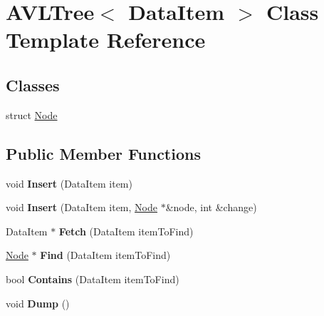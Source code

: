 \hypertarget{classAVLTree}{\section{A\-V\-L\-Tree$<$ Data\-Item $>$ Class Template Reference}
\label{classAVLTree}
}
\subsection*{Classes}
\begin{DoxyCompactItemize}
\item 
struct \hyperlink{structAVLTree_1_1Node}{Node}
\end{DoxyCompactItemize}
\subsection*{Public Member Functions}
\begin{DoxyCompactItemize}
\item 
\hypertarget{classAVLTree_a19150bcba8501c6ae6fb2b519ad64b05}{void {\bfseries Insert} (Data\-Item item)}\label{classAVLTree_a19150bcba8501c6ae6fb2b519ad64b05}

\item 
\hypertarget{classAVLTree_a7d45f6097e6f9f696ed80b80c8a88722}{void {\bfseries Insert} (Data\-Item item, \hyperlink{structAVLTree_1_1Node}{Node} $\ast$\&node, int \&change)}\label{classAVLTree_a7d45f6097e6f9f696ed80b80c8a88722}

\item 
\hypertarget{classAVLTree_a8c1cdcd4e4be5f0feb9b2bad5ef08b08}{Data\-Item $\ast$ {\bfseries Fetch} (Data\-Item item\-To\-Find)}\label{classAVLTree_a8c1cdcd4e4be5f0feb9b2bad5ef08b08}

\item 
\hypertarget{classAVLTree_a88e4e21a384e6dc4d9be64bfd26e642e}{\hyperlink{structAVLTree_1_1Node}{Node} $\ast$ {\bfseries Find} (Data\-Item item\-To\-Find)}\label{classAVLTree_a88e4e21a384e6dc4d9be64bfd26e642e}

\item 
\hypertarget{classAVLTree_af87b660c0c905507b3210abeecff8f8f}{bool {\bfseries Contains} (Data\-Item item\-To\-Find)}\label{classAVLTree_af87b660c0c905507b3210abeecff8f8f}

\item 
\hypertarget{classAVLTree_a04db67e206a1d00093ae74a6506dcf59}{void {\bfseries Dump} ()}\label{classAVLTree_a04db67e206a1d00093ae74a6506dcf59}

\end{DoxyCompactItemize}
